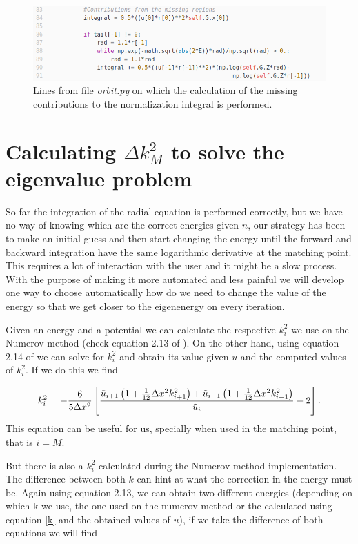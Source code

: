 \documentclass[12pt]{article}
\begin{document}
\begin{figure}[h!]
    \centering
    \includegraphics[width=\linewidth]{norm2}
    \caption{Lines from file \textit{orbit.py} on which the calculation of the missing contributions to the normalization integral is performed.}
    \label{fig:norm2}
\end{figure}

\section{Calculating $\Delta k_M^2$ to solve the eigenvalue problem}

So far the integration of the radial equation is performed correctly, but we have no way of knowing which are the correct energies given $n$, our strategy has been to make an initial guess and then start changing the energy until the forward and backward integration have the same logarithmic derivative at the matching point. This requires a lot of interaction with the user and it might be a slow process. With the purpose of making it more automated and less painful we will develop one way to choose automatically how do we need to change the value of the energy so that we get closer to the eigenenergy on every iteration.

Given an energy and a potential we can calculate the respective $k_i^2$ we use on the Numerov method (check equation 2.13 of \cite{zhangQ}). On the other hand, using equation 2.14 of \cite{zhangQ} we can solve for $k_i^2$ and obtain its value given $u$ and the computed values of $k_i^2$. If we do this we find

\begin{equation}
    k_i^2 = -\frac{6}{5\Delta x^2}\left[ \frac{\Tilde{u}_{i+1}\left(1+\frac{1}{12}\Delta x^2k_{i+1}^2\right) + \Tilde{u}_{i-1}\left(1+\frac{1}{12}\Delta x^2k_{i-1}^2\right)}{\Tilde{u}_i} -2\right].
    \label{k}
\end{equation}
This equation can be useful for us, specially when used in the matching point, that is $i=M$.

But there is also a $k_i^2$ calculated during the Numerov method implementation. The difference between both $k$ can hint at what the correction in the energy must be. Again using equation 2.13, we can obtain two different energies (depending on which k we use, the one used on the numerov method or the calculated using equation \ref{k} and the obtained values of $u$), if we take the difference of both equations we will find 
\end{document}
